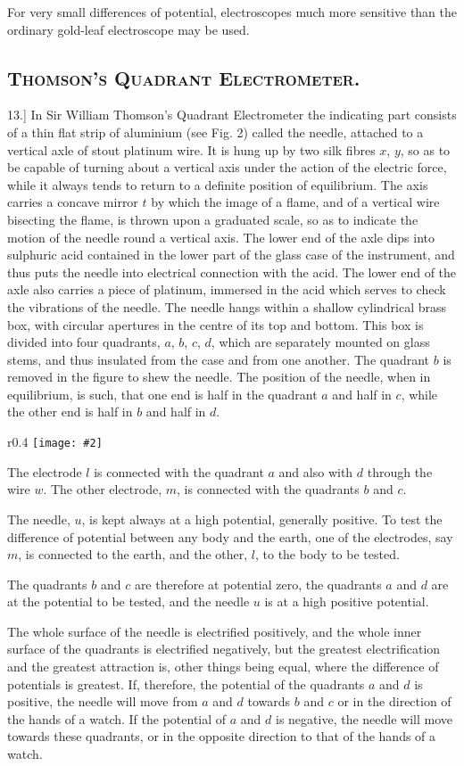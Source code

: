 \documentclass[12pt,oneside]{book}[2021/10/04]
\newcommand{\Heading}{\centering\normalfont}
\newcommand{\Section}[1]{\subsection*{\normalsize\Heading\scshape #1}}
\newcommand{\Runhead}[1]{\fancyhead[C]{\iffloatpage{}{\small#1}}}
\newcommand{\article}[1]{\phantomsection \label{art:#1}{#1.]}}
\newcommand{\wrapfig}[3]{
\begin{wrapfigure}{r}{#1\textwidth}
\centering
\texttt{[image: \#2]}
\caption*{\small #3}
\end{wrapfigure}}
\newcommand{\¬}{\hphantom{0}}
\begin{document}
For very small differences of potential, electroscopes much more
sensitive than the ordinary gold-leaf electroscope may be used.

\Section{Thomson's Quadrant Electrometer.}
\article{13} In Sir William Thomson's Quadrant Electrometer the indicating part
consists of a thin flat strip of aluminium (see
Fig. 2) called the needle, attached to a vertical axle of stout
platinum wire. It is hung up by two silk fibres \(x\), \(y\), so as to
be capable of turning about a vertical axis under the action of
the electric force, while it always tends to return to a definite
position of equilibrium. The axis carries a concave mirror \(t\) by
which the image of a flame, and of a vertical wire bisecting the
flame, is thrown upon a graduated scale, so as to indicate the
motion of the needle round a vertical axis. The lower end of
the axle dips into sulphuric acid contained in the lower part of
the glass case of the instrument, and thus puts the needle into
electrical connection with the acid. The lower end of the axle
also carries a piece of platinum, immersed in the acid which serves
to check the vibrations of the needle. The needle hangs within
a shallow cylindrical brass box, with circular apertures in the
centre of its top and bottom. This box
is divided into four quadrants, \(a\), \(b\), \(c\), \(d\),
which are separately mounted on glass
stems, and thus insulated from the case
and from one another. The quadrant \(b\)
is removed in the figure to shew the
needle. The position of the needle, when
in equilibrium, is such, that one end is
half in the quadrant \(a\) and half in \(c\),
while the other end is half in \(b\) and
half in \(d\).

\wrapfig{0.4}{028.png}{Fig. 2.}
The electrode \(l\) is connected with the
quadrant \(a\) and also with \(d\) through the
wire \(w\). The other electrode, \(m\), is connected
with the quadrants \(b\) and \(c\).

The needle, \(u\), is kept always at a
high potential, generally positive. To
test the difference of potential between
any body and the earth, one of the electrodes, say \(m\), is connected
to the earth, and the other, \(l\), to the body to be tested.
\Runhead{QUADRANT ELECTROMETER.}

The quadrants \(b\) and \(c\) are therefore at potential zero, the
quadrants \(a\) and \(d\) are at the potential to be tested, and the needle
\(u\) is at a high positive potential.

The whole surface of the needle is electrified positively, and
the whole inner surface of the quadrants is electrified negatively,
but the greatest electrification and the greatest attraction is, other
things being equal, where the difference of potentials is greatest.
If, therefore, the potential of the quadrants \(a\) and \(d\) is positive,
the needle will move from \(a\) and \(d\) towards \(b\) and \(c\) or in the
direction of the hands of a watch. If the potential of \(a\) and \(d\) is
negative, the needle will move towards these quadrants, or in the
opposite direction to that of the hands of a watch.
\end{document}
